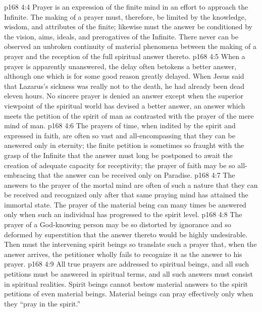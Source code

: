 \pc \vs p168 4:4 \bibnobreakspace Prayer is an expression of the finite mind in an effort to approach the Infinite. The making of a prayer must, therefore, be limited by the knowledge, wisdom, and attributes of the finite; likewise must the answer be conditioned by the vision, aims, ideals, and prerogatives of the Infinite. There never can be observed an unbroken continuity of material phenomena between the making of a prayer and the reception of the full spiritual answer thereto.
\pc \vs p168 4:5 \bibnobreakspace When a prayer is apparently unanswered, the delay often betokens a better answer, although one which is for some good reason greatly delayed. When Jesus said that Lazarus’s sickness was really not to the death, he had already been dead eleven hours. No sincere prayer is denied an answer except when the superior viewpoint of the spiritual world has devised a better answer, an answer which meets the petition of the spirit of man as contrasted with the prayer of the mere mind of man.
\pc \vs p168 4:6 \bibnobreakspace The prayers of time, when indited by the spirit and expressed in faith, are often so vast and all\hyp{}encompassing that they can be answered only in eternity; the finite petition is sometimes so fraught with the grasp of the Infinite that the answer must long be postponed to await the creation of adequate capacity for receptivity; the prayer of faith may be so all\hyp{}embracing that the answer can be received only on Paradise.
\pc \vs p168 4:7 \bibnobreakspace The answers to the prayer of the mortal mind are often of such a nature that they can be received and recognized only after that same praying mind has attained the immortal state. The prayer of the material being can many times be answered only when such an individual has progressed to the spirit level.
\pc \vs p168 4:8 \bibnobreakspace The prayer of a God\hyp{}knowing person may be so distorted by ignorance and so deformed by superstition that the answer thereto would be highly undesirable. Then must the intervening spirit beings so translate such a prayer that, when the answer arrives, the petitioner wholly fails to recognize it as the answer to his prayer.
\pc \vs p168 4:9 \bibnobreakspace All true prayers are addressed to spiritual beings, and all such petitions must be answered in spiritual terms, and all such answers must consist in spiritual realities. Spirit beings cannot bestow material answers to the spirit petitions of even material beings. Material beings can pray effectively only when they “pray in the spirit.”
